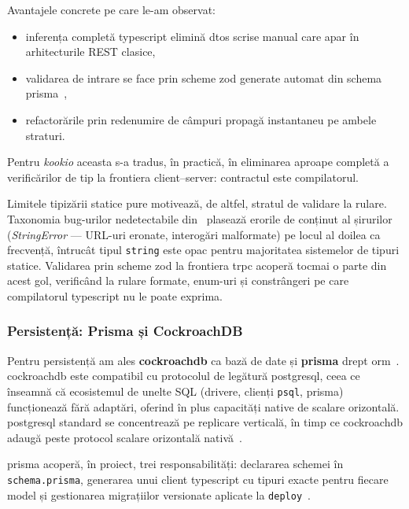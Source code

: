 Avantajele concrete pe care le-am observat:
\begin{itemize}
  \item inferența completă \gls{typescript} elimină \glspl{dto} scrise manual care apar în arhitecturile REST clasice,
  \item validarea de intrare se face prin scheme \gls{zod} generate automat din schema \gls{prisma}~\cite{zod,prisma_zod_generator},
  \item refactorările prin redenumire de câmpuri propagă instantaneu pe ambele straturi.
\end{itemize}

Pentru \textit{\gls{kookio}} aceasta s-a tradus, în practică, în eliminarea aproape completă a verificărilor de tip la frontiera client--server: contractul este compilatorul.

Limitele tipizării statice pure motivează, de altfel, stratul de validare la rulare. Taxonomia bug-urilor nedetectabile din~\cite{gao2017type} plasează erorile de conținut al șirurilor (\textit{StringError} --- URL-uri eronate, interogări malformate) pe locul al doilea ca frecvență, întrucât tipul \texttt{string} este opac pentru majoritatea sistemelor de tipuri statice. Validarea prin scheme \gls{zod} la frontiera \gls{trpc} acoperă tocmai o parte din acest gol, verificând la rulare formate, enum-uri și constrângeri pe care compilatorul \gls{typescript} nu le poate exprima.

\subsubsection{Persistență: Prisma și CockroachDB}\label{subsec:persistenta}

Pentru persistență am ales \textbf{\gls{cockroachdb}} ca bază de date și \textbf{\gls{prisma}} drept \gls{orm}~\cite{prisma_orm,cockroachdb}.
\gls{cockroachdb} este compatibil cu protocolul de legătură \gls{postgresql}, ceea ce înseamnă că ecosistemul de unelte SQL (drivere, clienți \texttt{psql}, \gls{prisma}) funcționează fără adaptări, oferind în plus capacități native de scalare orizontală.
\gls{postgresql} standard se concentrează pe replicare verticală, în timp ce \gls{cockroachdb} adaugă peste protocol scalare orizontală nativă~\cite{cockroachdb}.

\gls{prisma} acoperă, în proiect, trei responsabilități: declararea schemei în \texttt{schema.prisma}, generarea unui client \gls{typescript} cu tipuri exacte pentru fiecare model și gestionarea migrațiilor versionate aplicate la \texttt{deploy}~\cite{prisma_orm}.

